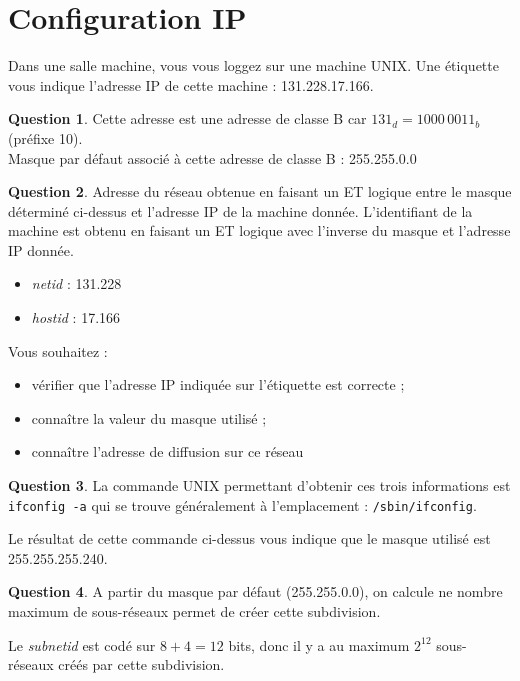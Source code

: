 \documentclass[11pt,english,french]{scrreprt}
\theoremstyle{remark}
\theoremstyle{definition}
\newtheorem{ques}{Question}[section]
\begin{document}
\section{Configuration IP} %

Dans une salle machine, vous vous loggez sur une machine UNIX. Une étiquette vous indique l'adresse IP de cette machine : 131.228.17.166.

\begin{ques}
	Cette adresse est une adresse de classe B car $131_d = 1000\,0011_b$ (préfixe 10).\\
	Masque par défaut associé à cette adresse de classe B : 255.255.0.0 
\end{ques}

\begin{ques}
	Adresse du réseau obtenue en faisant un ET logique entre le masque déterminé ci-dessus et l'adresse IP de la machine donnée. L'identifiant de la machine est obtenu en faisant un ET logique avec l'inverse du masque et l'adresse IP donnée.\begin{itemize}
		\item \emph{netid} : 131.228
		\item \emph{hostid} : 17.166
	\end{itemize}
\end{ques}

Vous souhaitez :\begin{itemize}
	\item vérifier que l'adresse IP indiquée sur l'étiquette est correcte ;
	\item connaître la valeur du masque utilisé ;
	\item connaître l'adresse de diffusion sur ce réseau
\end{itemize}

\begin{ques}
	La commande UNIX permettant d'obtenir ces trois informations est \lstinline!ifconfig -a! qui se trouve généralement à l'emplacement : \lstinline!/sbin/ifconfig!.
\end{ques}

Le résultat de cette commande ci-dessus vous indique que le masque utilisé est 255.255.255.240.

\begin{ques}
	A partir du masque par défaut (255.255.0.0), on calcule ne nombre maximum de sous-réseaux permet de créer cette subdivision.
	
	Le \emph{subnetid} est codé sur $8+4=12$ bits, donc il y a au maximum $2^{12}$ sous-réseaux créés par cette subdivision.
\end{ques}
\end{document}
